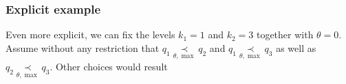 \subsubsection{Explicit example}
\def\kOne{1}
\def\kTwo{3}
\def\zkOnepzKtwo{14} %
\def\zkOne{2} %
\def\zkTwo{6} %

Even more explicit, we can fix the levels $k_1=\kOne$ and $k_2=\kTwo$ together
with $\theta=0$.
Assume without any restriction that $q_1 \underset{\theta,\max}{\prec} q_2$
and $q_1 \underset{\theta,\max}{\prec} q_3$ as well as
$q_2 \underset{\theta,\max}{\prec} q_3$.
Other choices would result 

